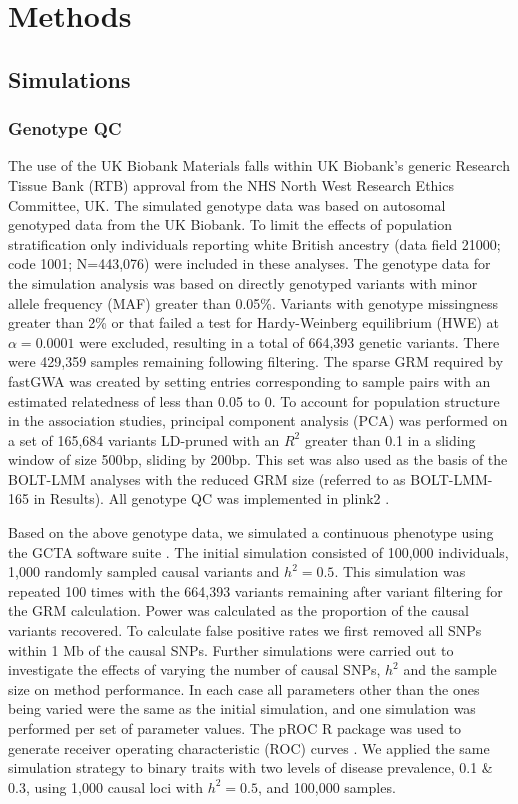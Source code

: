 \documentclass[fleqn,10pt]{wlscirep}
\begin{document}
 
\section*{Methods}
\subsection*{Simulations} 
\subsubsection*{Genotype QC}
The use of the UK Biobank Materials falls within UK Biobank's generic Research Tissue Bank (RTB) approval from the NHS North West Research Ethics Committee, UK. The simulated genotype data was based on autosomal genotyped data from the UK Biobank. To limit the effects of population stratification only individuals reporting white British ancestry (data field 21000; code 1001; N=443,076) were included in these analyses. The genotype data for the simulation analysis was based on directly genotyped variants with minor allele frequency (MAF) greater than 0.05\%. Variants with genotype missingness greater than 2\% or that failed a test for Hardy-Weinberg equilibrium (HWE) at $\alpha{=0.0001}$ were excluded, resulting in a total of 664,393 genetic variants. There were 429,359 samples remaining following filtering. The sparse GRM required by fastGWA was created by setting entries corresponding to sample pairs with an estimated relatedness of less than 0.05 to 0. To account for population structure in the association studies, principal component analysis (PCA) was performed on a set of 165,684 variants LD-pruned with an $R^2$ greater than 0.1 in a sliding window of size 500bp, sliding by 200bp. This set was also used as the basis of the BOLT-LMM analyses with the reduced GRM size (referred to as BOLT-LMM-165 in Results). All genotype QC was implemented in plink2 \cite{chang2015second}.

Based on the above genotype data, we simulated a continuous phenotype using the GCTA software suite \cite{yang2011gcta}. The initial simulation consisted of 100,000 individuals, 1,000 randomly sampled causal variants and $h^2 = 0.5$. This simulation was repeated 100 times with the 664,393 variants remaining after variant filtering for the GRM calculation. Power was calculated as the proportion of the causal variants recovered. To calculate false positive rates we first removed all SNPs within 1 Mb of the causal SNPs. Further simulations were carried out to investigate the effects of varying the number of causal SNPs, $h^2$ and the sample size on method performance. In each case all parameters other than the ones being varied were the same as the initial simulation, and one simulation was performed per set of parameter values. The pROC R package was used to generate receiver operating characteristic (ROC) curves \cite{robin2011proc}. We applied the same simulation strategy to binary traits with two levels of disease prevalence, 0.1 \& 0.3, using 1,000 causal loci with $h^2=0.5$, and 100,000 samples.
\end{document}
